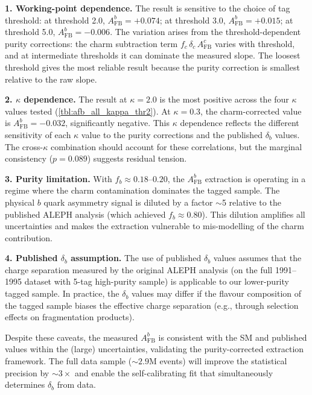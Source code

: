 \documentclass[11pt,a4paper]{article}
\begin{document}
\textbf{1. Working-point dependence.}
The result is sensitive to the choice of tag threshold:
at threshold 2.0, $A_\text{FB}^b = +0.074$;
at threshold 3.0, $A_\text{FB}^b = +0.015$;
at threshold 5.0, $A_\text{FB}^b = -0.006$.
The variation arises from the threshold-dependent purity
corrections: the charm subtraction term
$f_c\,\delta_c\,A_\text{FB}^c$ varies with threshold, and at
intermediate thresholds it can dominate the measured slope.
The loosest threshold gives the most reliable result because the
purity correction is smallest relative to the raw slope.

\textbf{2. $\kappa$ dependence.}
The result at $\kappa = 2.0$ is the most positive across the
four $\kappa$ values tested (\cref{tbl:afb_all_kappa_thr2}).
At $\kappa = 0.3$, the charm-corrected value is
$A_\text{FB}^b = -0.032$, significantly negative.
This $\kappa$ dependence reflects the different sensitivity of
each $\kappa$ value to the purity corrections and the published
$\delta_b$ values.
The cross-$\kappa$ combination should account for these
correlations, but the marginal consistency ($p = 0.089$)
suggests residual tension.

\textbf{3. Purity limitation.}
With $f_b \approx 0.18$--$0.20$, the $A_\text{FB}^b$
extraction is operating in a regime where the charm contamination
dominates the tagged sample.
The physical $b$ quark asymmetry signal is diluted by a factor
$\sim$5 relative to the published ALEPH analysis (which achieved
$f_b \approx 0.80$).
This dilution amplifies all uncertainties and makes the extraction
vulnerable to mis-modelling of the charm contribution.

\textbf{4. Published $\delta_b$ assumption.}
The use of published $\delta_b$ values assumes that the charge
separation measured by the original ALEPH analysis (on the full
1991--1995 dataset with 5-tag high-purity sample) is applicable
to our lower-purity tagged sample.
In practice, the $\delta_b$ values may differ if the flavour
composition of the tagged sample biases the effective charge
separation (e.g., through selection effects on fragmentation
products).

Despite these caveats, the measured $A_\text{FB}^b$ is consistent
with the SM and published values within the (large) uncertainties,
validating the purity-corrected extraction framework.
The full data sample (${\sim}2.9$M events) will improve the statistical
precision by $\sim 3\times$ and enable the self-calibrating fit
that simultaneously determines $\delta_b$ from data.
\end{document}

